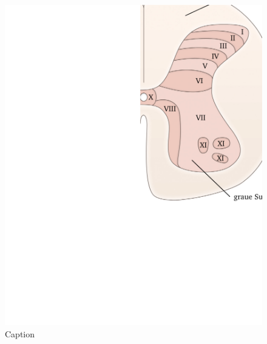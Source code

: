 \documentclass[12pt,a4paper,pdftex]{article}
\begin{document}
\begin{itemize}
    \begin{figure}
        \centering
        \includegraphics{pictures/somatosensory/graymatter.png}
        \caption{Caption}
        \label{fig:graymatter}
    \end{figure}
    

\end{itemize}
\end{document}
